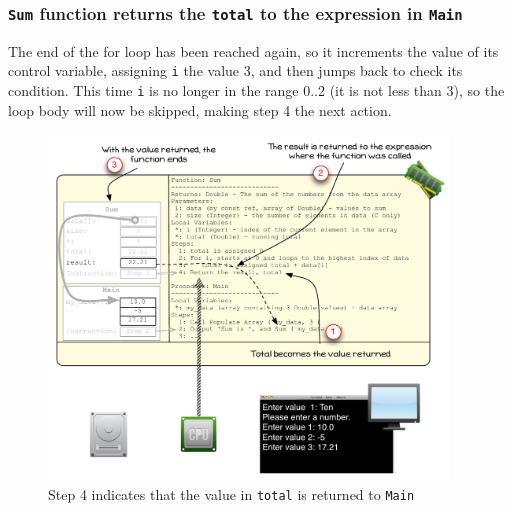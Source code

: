 \clearpage
\subsubsection{\texttt{Sum} function returns the \texttt{total} to the expression in \texttt{Main}} %
\label{ssub:sum_function_returns_the_total_to_the_expression_in_main}

The end of the for loop has been reached again, so it increments the value of its control variable, assigning \texttt{i} the value 3, and then jumps back to check its condition. This time \texttt{i} is no longer in the range 0..2 (it is not less than 3), so the loop body will now be skipped, making step 4 the next action. 

\begin{figure}[htbp]
   \centering
   \includegraphics[width=0.95\textwidth]{./topics/arrays/images/Sum10} 
   \caption{Step 4 indicates that the value in \texttt{total} is returned to \texttt{Main}}
   \label{fig:sum-array-vis-10}
\end{figure}


